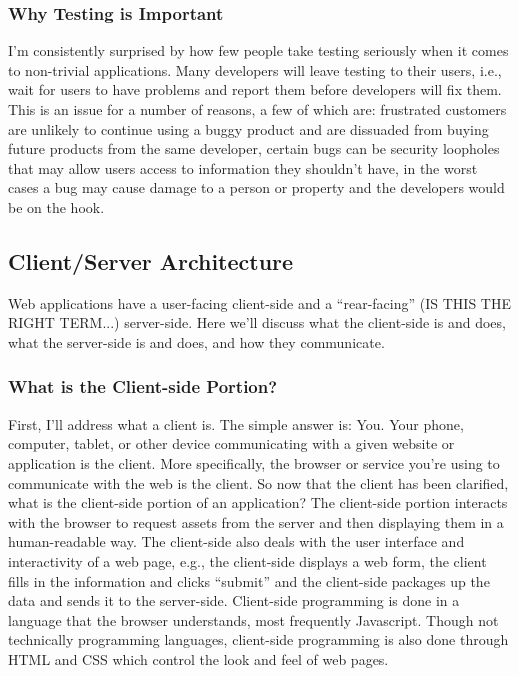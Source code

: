 \documentclass[11pt]{article}
\begin{document}
\subsubsection{Why Testing is Important}
I'm consistently surprised by how few people take testing seriously when it comes to non-trivial applications. Many developers will leave testing to their users, i.e., wait for users to have problems and report them before developers will fix them. This is an issue for a number of reasons, a few of which are: frustrated customers are unlikely to continue using a buggy product and are dissuaded from buying future products from the same developer, certain bugs can be security loopholes that may allow users access to information they shouldn't have, in the worst cases a bug may cause damage to a person or property and the developers would be on the hook.


\subsection{Client/Server Architecture}
Web applications have a user-facing client-side and a ``rear-facing'' (IS THIS THE RIGHT TERM...) server-side.
Here we'll discuss what the client-side is and does, what the server-side is and does, and how they communicate.

\subsubsection{What is the Client-side Portion?}
First, I'll address what a client is. The simple answer is: You. Your phone, computer, tablet, or other device communicating with a given website or application is the client. More specifically, the browser or service you're using to communicate with the web is the client. 
So now that the client has been clarified, what is the client-side portion of an application? The client-side portion interacts with the browser to request assets from the server and then displaying them in a human-readable way. The client-side also deals with the user interface and interactivity of a web page, e.g., the client-side displays a web form, the client fills in the information and clicks ``submit'' and the client-side packages up the data and sends it to the server-side.
Client-side programming is done in a language that the browser understands, most frequently Javascript. Though not technically programming languages, client-side programming is also done through HTML and CSS which control the look and feel of web pages.
\end{document}
